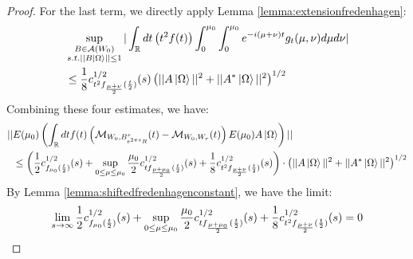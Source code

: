 \documentclass[a4paper,11pt]{article}
\theoremstyle{definition}
\newcommand{\lb}{\left(}
\newcommand{\rb}{\right)}
\begin{document}
\begin{proof}
    For the last term, we directly apply Lemma \ref{lemma:extensionfredenhagen}:
    \begin{align}
        \begin{split}
            &\sup_{\substack{B\in\mathcal{A}(W_0)\\s.t.||B\ket{\Omega}||\leq 1}}|\int_\mathbb{R} dt \lb t^2f(t) \rb\int_0^{\mu_0}\int_0^{\mu_0}e^{-i(\mu + \nu)t}g_t(\mu,\nu)d\mu d\nu|
            \\&
            \leq \frac{1}{8}c_{t^2f_{\frac{\mu + \nu}{2}}(\frac{t}{2})}^{1/2}(s)\lb||A\ket{\Omega}||^2 + ||A^*\ket{\Omega}||^2\rb^{1/2}
        \end{split}
    \end{align}
    Combining these four estimates, we have:
    {\small
\begin{align}
        \begin{split}
            ||&E(\mu_0)\lb\int_\mathbb{R} dt f(t)\lb \mathcal{M}_{W_0, B^r_{e^{2\pi s}R}}(t) - \mathcal{M}_{W_0, W_r}(t) \rb E(\mu_0)A\ket{\Omega}\rb||
            \\&
            \leq \lb \frac{1}{2}c^{1/2}_{f_{\mu_0}(\frac{t}{2})}(s) + \sup_{0\leq\mu\leq\mu_0}\frac{\mu_0}{2} c^{1/2}_{tf_{\frac{\mu + \mu_0}{2}}(\frac{t}{2})}(s) + \frac{1}{8}c^{1/2}_{t^2f_{\frac{\mu + \nu}{2}}(\frac{t}{2})}(s)\rb\cdot\lb||A\ket{\Omega}||^2 + ||A^*\ket{\Omega}||^2\rb^{1/2}
        \end{split}
    \end{align}
}
    By Lemma \ref{lemma:shiftedfredenhagenconstant}, we have the limit:
    \begin{equation}
        \lim_{s\rightarrow\infty}\frac{1}{2}c^{1/2}_{f_{\mu_0}(\frac{t}{2})}(s) + \sup_{0\leq\mu\leq\mu_0}\frac{\mu_0}{2} c^{1/2}_{tf_{\frac{\mu + \mu_0}{2}}(\frac{t}{2})}(s) + \frac{1}{8}c^{1/2}_{t^2f_{\frac{\mu + \nu}{2}}(\frac{t}{2})}(s) = 0\qedhere
    \end{equation}
\end{proof}
\end{document}

